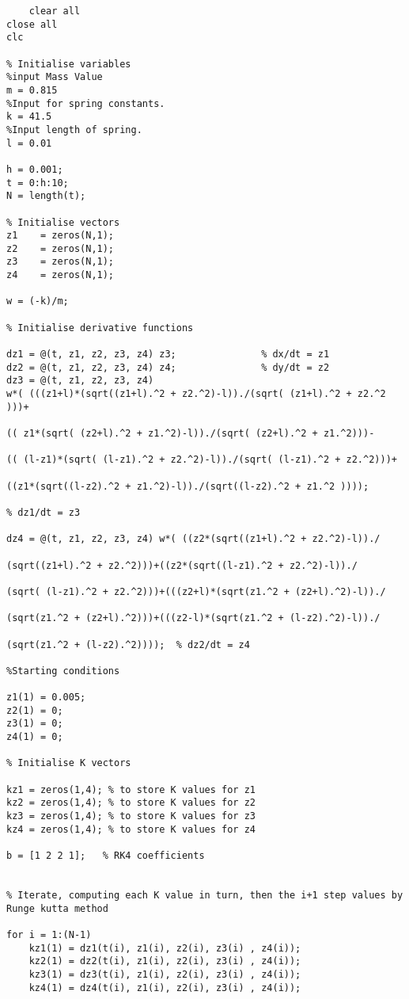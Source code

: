 \begin{framed}
\begin{verbatim}
    clear all
close all
clc

% Initialise variables
%input Mass Value
m = 0.815
%Input for spring constants.
k = 41.5
%Input length of spring.
l = 0.01

h = 0.001;
t = 0:h:10;
N = length(t);

% Initialise vectors
z1    = zeros(N,1);
z2    = zeros(N,1);
z3    = zeros(N,1);
z4    = zeros(N,1);

w = (-k)/m;

% Initialise derivative functions

dz1 = @(t, z1, z2, z3, z4) z3;               % dx/dt = z1 
dz2 = @(t, z1, z2, z3, z4) z4;               % dy/dt = z2 
dz3 = @(t, z1, z2, z3, z4)
w*( (((z1+l)*(sqrt((z1+l).^2 + z2.^2)-l))./(sqrt( (z1+l).^2 + z2.^2 )))+ 

(( z1*(sqrt( (z2+l).^2 + z1.^2)-l))./(sqrt( (z2+l).^2 + z1.^2)))-

(( (l-z1)*(sqrt( (l-z1).^2 + z2.^2)-l))./(sqrt( (l-z1).^2 + z2.^2)))+

((z1*(sqrt((l-z2).^2 + z1.^2)-l))./(sqrt((l-z2).^2 + z1.^2 ))));

% dz1/dt = z3

dz4 = @(t, z1, z2, z3, z4) w*( ((z2*(sqrt((z1+l).^2 + z2.^2)-l))./

(sqrt((z1+l).^2 + z2.^2)))+((z2*(sqrt((l-z1).^2 + z2.^2)-l))./

(sqrt( (l-z1).^2 + z2.^2)))+(((z2+l)*(sqrt(z1.^2 + (z2+l).^2)-l))./

(sqrt(z1.^2 + (z2+l).^2)))+(((z2-l)*(sqrt(z1.^2 + (l-z2).^2)-l))./

(sqrt(z1.^2 + (l-z2).^2))));  % dz2/dt = z4 

%Starting conditions

z1(1) = 0.005; 
z2(1) = 0;
z3(1) = 0;
z4(1) = 0;

% Initialise K vectors

kz1 = zeros(1,4); % to store K values for z1
kz2 = zeros(1,4); % to store K values for z2
kz3 = zeros(1,4); % to store K values for z3
kz4 = zeros(1,4); % to store K values for z4

b = [1 2 2 1];   % RK4 coefficients


% Iterate, computing each K value in turn, then the i+1 step values by
Runge kutta method

for i = 1:(N-1)
    kz1(1) = dz1(t(i), z1(i), z2(i), z3(i) , z4(i));
    kz2(1) = dz2(t(i), z1(i), z2(i), z3(i) , z4(i));
    kz3(1) = dz3(t(i), z1(i), z2(i), z3(i) , z4(i));
    kz4(1) = dz4(t(i), z1(i), z2(i), z3(i) , z4(i));


\end{verbatim}
\end{framed}
